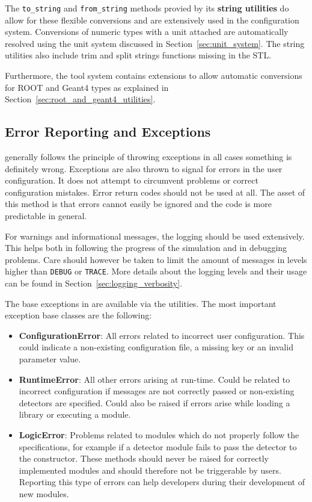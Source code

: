 The \apsq \texttt{to\_string} and \texttt{from\_string} methods provied by its \textbf{string utilities} do allow for these flexible conversions and are extensively used in the configuration system.
Conversions of numeric types with a unit attached are automatically resolved using the unit system discussed in Section~\ref{sec:unit_system}.
The string utilities also include trim and split strings functions missing in the STL.

Furthermore, the \apsq tool system contains extensions to allow automatic conversions for ROOT and Geant4 types as explained in Section~\ref{sec:root_and_geant4_utilities}.


\subsection{Error Reporting and Exceptions}
\label{sec:error_reporting_exceptions}
\apsq generally follows the principle of throwing exceptions in all cases something is definitely wrong.
Exceptions are also thrown to signal for errors in the user configuration.
It does not attempt to circumvent problems or correct configuration mistakes.
Error return codes should not be used at all.
The asset of this method is that errors cannot easily be ignored and the code is more predictable in general.

For warnings and informational messages, the logging should be used extensively.
This helps both in following the progress of the simulation and in debugging problems.
Care should however be taken to limit the amount of messages in levels higher than \texttt{DEBUG} or \texttt{TRACE}.
More details about the logging levels and their usage can be found in Section~\ref{sec:logging_verbosity}.

The base exceptions in \apsq are available via the utilities.
The most important exception base classes are the following:
\begin{itemize}
\item \textbf{ConfigurationError}: All errors related to incorrect user configuration.
This could indicate a non-existing configuration file, a missing key or an invalid parameter value.
\item \textbf{RuntimeError}: All other errors arising at run-time.
Could be related to incorrect configuration if messages are not correctly passed or non-existing detectors are specified.
Could also be raised if errors arise while loading a library or executing a module.
\item \textbf{LogicError}: Problems related to modules which do not properly follow the specifications, for example if a detector module fails to pass the detector to the constructor.
These methods should never be raised for correctly implemented modules and should therefore not be triggerable by users.
Reporting this type of errors can help developers during their development of new modules.
\end{itemize}

